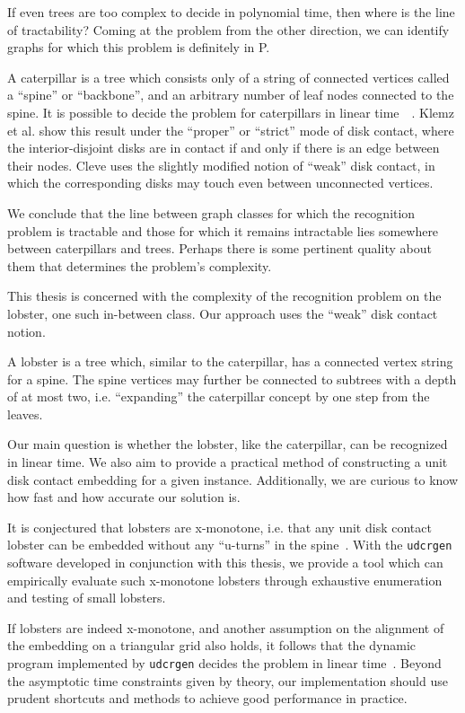 If even trees are too complex to decide in polynomial time, then where is the line of tractability? Coming at the problem from the other direction, we can identify graphs for which this problem is definitely in P.

A caterpillar is a tree which consists only of a string of connected vertices called a ``spine'' or ``backbone'', and an arbitrary number of leaf nodes connected to the spine.
It is possible to decide the problem for caterpillars in linear time~\cite{Klemz2015}~\cite{Cleve2020}. Klemz et al. show this result under the ``proper'' or ``strict'' mode of disk contact, where the interior-disjoint disks are in contact if and only if there is an edge between their nodes. Cleve uses the slightly modified notion of ``weak'' disk contact, in which the corresponding disks may touch even between unconnected vertices.

We conclude that the line between graph classes for which the recognition problem is tractable and those for which it remains intractable lies somewhere between caterpillars and trees. Perhaps there is some pertinent quality about them that determines the problem's complexity.

This thesis is concerned with the complexity of the recognition problem on the lobster, one such in-between class. Our approach uses the ``weak'' disk contact notion.

A lobster is a tree which, similar to the caterpillar, has a connected vertex string for a spine.
The spine vertices may further be connected to subtrees with a depth of at most two, i.e. ``expanding'' the caterpillar concept by one step from the leaves.

Our main question is whether the lobster, like the caterpillar, can be recognized in linear time. We also aim to provide a practical method of constructing a unit disk contact embedding for a given instance. Additionally, we are curious to know how fast and how accurate our solution is.

It is conjectured that lobsters are x-monotone, i.e. that any unit disk contact lobster can be embedded without any ``u-turns'' in the spine~\cite{Bhore2021}. With the \texttt{udcrgen} software developed in conjunction with this thesis, we provide a tool which can empirically evaluate such x-monotone lobsters through exhaustive enumeration and testing of small lobsters.

If lobsters are indeed x-monotone, and another assumption on the alignment of the embedding on a triangular grid also holds, it follows that the dynamic program implemented by \texttt{udcrgen} decides the problem in linear time~\cite{Bhore2021}. Beyond the asymptotic time constraints given by theory, our implementation should use prudent shortcuts and methods to achieve good performance in practice.

